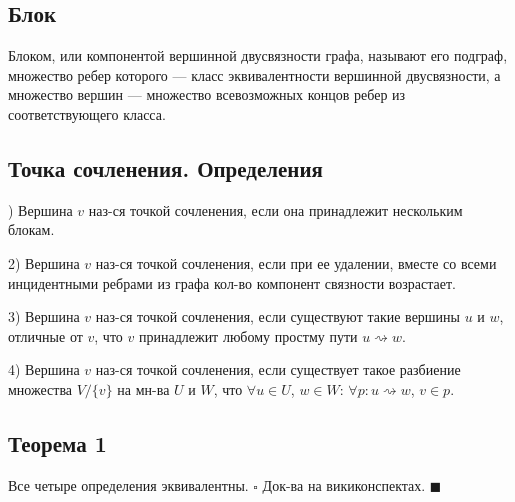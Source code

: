 \documentclass{article}
\begin{document}
\subsection {Блок}
Блоком, или компонентой вершинной двусвязности графа, называют его подграф, множество ребер которого — класс эквивалентности вершинной двусвязности, а множество вершин — множество всевозможных концов ребер из соответствующего класса.\newline\newline

\subsection {Точка сочленения. Определения}
) Вершина \(v\) наз-ся точкой сочленения, если она принадлежит нескольким блокам. \newline

2) Вершина  \(v\) наз-ся точкой сочленения, если при ее удалении, вместе со всеми инцидентными ребрами из графа кол-во компонент связности возрастает.\newline

3) Вершина  \(v\) наз-ся точкой сочленения, если существуют такие вершины \(u\) и \(w\), отличные от \(v\), что \(v\) принадлежит любому простму пути \(u \rightsquigarrow w\).\newline

4) Вершина  \(v\) наз-ся точкой сочленения, если существует такое разбиение множества \(V/\{v\}\) на мн-ва \(U\) и \(W\), что \(\forall u \in U\), \(w \in W\): \(\forall p: u \rightsquigarrow w\), \(v \in p\).\newline

\subsection {Теорема 1}
Все четыре определения эквивалентны.\newline
\(\square\)
Док-ва на викиконспектах.
\(\blacksquare\)
\end{document}
